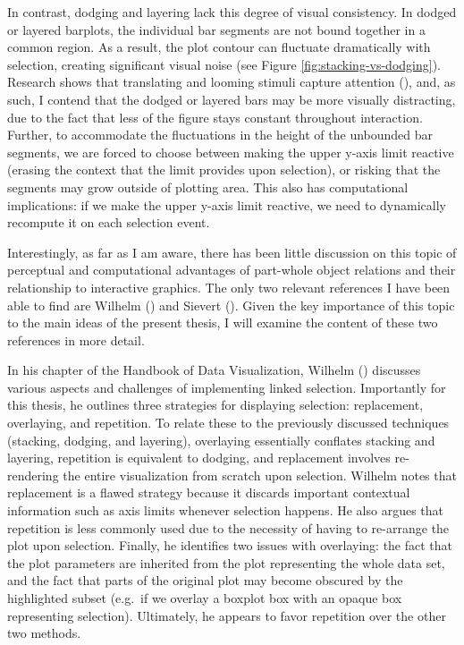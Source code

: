 \documentclass[
  openany]{book}
\theoremstyle{definition}
\theoremstyle{definition}
\theoremstyle{definition}
\theoremstyle{definition}
\theoremstyle{remark}
\begin{document}
In contrast, dodging and layering lack this degree of visual consistency. In dodged or layered barplots, the individual bar segments are not bound together in a common region. As a result, the plot contour can fluctuate dramatically with selection, creating significant visual noise (see Figure \ref{fig:stacking-vs-dodging}). Research shows that translating and looming stimuli capture attention (), and, as such, I contend that the dodged or layered bars may be more visually distracting, due to the fact that less of the figure stays constant throughout interaction. Further, to accommodate the fluctuations in the height of the unbounded bar segments, we are forced to choose between making the upper y-axis limit reactive (erasing the context that the limit provides upon selection), or risking that the segments may grow outside of plotting area. This also has computational implications: if we make the upper y-axis limit reactive, we need to dynamically recompute it on each selection event.

Interestingly, as far as I am aware, there has been little discussion on this topic of perceptual and computational advantages of part-whole object relations and their relationship to interactive graphics. The only two relevant references I have been able to find are Wilhelm () and Sievert (). Given the key importance of this topic to the main ideas of the present thesis, I will examine the content of these two references in more detail.

In his chapter of the Handbook of Data Visualization, Wilhelm () discusses various aspects and challenges of implementing linked selection. Importantly for this thesis, he outlines three strategies for displaying selection: replacement, overlaying, and repetition. To relate these to the previously discussed techniques (stacking, dodging, and layering), overlaying essentially conflates stacking and layering, repetition is equivalent to dodging, and replacement involves re-rendering the entire visualization from scratch upon selection. Wilhelm notes that replacement is a flawed strategy because it discards important contextual information such as axis limits whenever selection happens. He also argues that repetition is less commonly used due to the necessity of having to re-arrange the plot upon selection. Finally, he identifies two issues with overlaying: the fact that the plot parameters are inherited from the plot representing the whole data set, and the fact that parts of the original plot may become obscured by the highlighted subset (e.g.~if we overlay a boxplot box with an opaque box representing selection). Ultimately, he appears to favor repetition over the other two methods.
\end{document}
